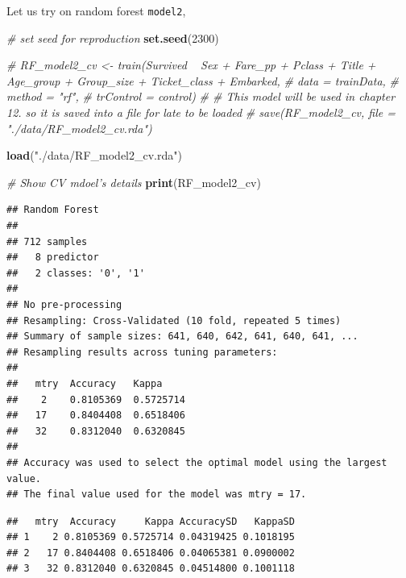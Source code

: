 \documentclass[
]{book}
\newenvironment{Shaded}{\begin{snugshade}}{\end{snugshade}}
\newcommand{\CommentTok}[1]{\textcolor[rgb]{0.56,0.35,0.01}{\textit{#1}}}
\newcommand{\DecValTok}[1]{\textcolor[rgb]{0.00,0.00,0.81}{#1}}
\newcommand{\KeywordTok}[1]{\textcolor[rgb]{0.13,0.29,0.53}{\textbf{#1}}}
\newcommand{\NormalTok}[1]{#1}
\newcommand{\OperatorTok}[1]{\textcolor[rgb]{0.81,0.36,0.00}{\textbf{#1}}}
\newcommand{\StringTok}[1]{\textcolor[rgb]{0.31,0.60,0.02}{#1}}
\begin{document}
Let us try on random forest \texttt{model2},

\begin{Shaded}
\begin{Highlighting}[]
\CommentTok{# set seed for reproduction}
\KeywordTok{set.seed}\NormalTok{(}\DecValTok{2300}\NormalTok{)}

\CommentTok{# RF_model2_cv <- train(Survived ~ Sex + Fare_pp + Pclass + Title + Age_group + Group_size + Ticket_class + Embarked,}
\CommentTok{#                        data = trainData, }
\CommentTok{#                        method = "rf", }
\CommentTok{#                        trControl = control)}
\CommentTok{# # This model will be used in chapter 12. so it is saved into a file for late to be loaded}
\CommentTok{# save(RF_model2_cv, file = "./data/RF_model2_cv.rda")}

\KeywordTok{load}\NormalTok{(}\StringTok{"./data/RF_model2_cv.rda"}\NormalTok{)}

\CommentTok{# Show CV mdoel's details}
\KeywordTok{print}\NormalTok{(RF_model2_cv)}
\end{Highlighting}
\end{Shaded}

\begin{verbatim}
## Random Forest 
## 
## 712 samples
##   8 predictor
##   2 classes: '0', '1' 
## 
## No pre-processing
## Resampling: Cross-Validated (10 fold, repeated 5 times) 
## Summary of sample sizes: 641, 640, 642, 641, 640, 641, ... 
## Resampling results across tuning parameters:
## 
##   mtry  Accuracy   Kappa    
##    2    0.8105369  0.5725714
##   17    0.8404408  0.6518406
##   32    0.8312040  0.6320845
## 
## Accuracy was used to select the optimal model using the largest value.
## The final value used for the model was mtry = 17.
\end{verbatim}

\begin{Shaded}
\end{Shaded}

\begin{verbatim}
##   mtry  Accuracy     Kappa AccuracySD   KappaSD
## 1    2 0.8105369 0.5725714 0.04319425 0.1018195
## 2   17 0.8404408 0.6518406 0.04065381 0.0900002
## 3   32 0.8312040 0.6320845 0.04514800 0.1001118
\end{verbatim}
\end{document}
